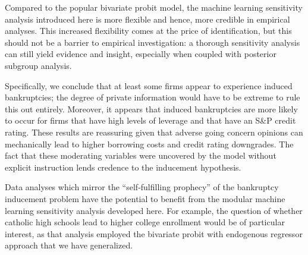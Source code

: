 \documentclass[aoas,preprint, 11pt, dvipsnames, table, x11name]{imsart}
\theoremstyle{remark}
\begin{document}
	Compared to the popular bivariate probit model, the machine learning sensitivity analysis introduced here is more flexible and hence, more credible in empirical analyses. This increased flexibility comes at the price of identification, but this should not be a barrier to empirical investigation: a thorough sensitivity analysis can still yield evidence and insight, especially when coupled with posterior subgroup analysis.
	
	Specifically, we conclude that at least some firms appear to experience induced bankruptcies; the degree of private information would have to be extreme to rule this out entirely. Moreover, it appears that induced bankruptcies are more likely to occur for firms that have high levels of leverage and that have an S\&P credit rating. These results are reassuring given that adverse going concern opinions can mechanically lead to higher borrowing costs and credit rating downgrades. The fact that these moderating variables were uncovered by the model without explicit instruction lends credence to the inducement hypothesis.
	
	
	
	
	Data analyses which mirror the ``self-fulfilling prophecy'' of the bankruptcy inducement problem have the potential to benefit from the modular machine learning sensitivity analysis developed here. For example, the question of whether catholic high schools lead to higher college enrollment \citep{Evans-Schwab-1995} would be of particular interest, as that analysis employed the bivariate probit with endogenous regressor approach that we have generalized.
	
\end{document}
